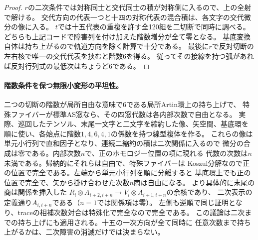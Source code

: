 \begin{proof}
$r$の二次条件では対称同士と交代同士の積が対称側に入るので、上の全射で解ける。
交代方向の代表一つと十四の対称代表の混合積は、各文字の交代微分の像に入る。
$t$では十五代表の重複を許す全120組を二切断で同時に調べる。
どちらも上記コードで障害列を付け加えた階数増分が全て零となる。
基底変換自体は持ち上がるので軌道方向を除く計算で十分である。
最後に$r$で反対切断の左右核で唯一の交代代表を挟むと階数6を得る。
従ってその接線を持つ弧があれば反対行列式の最低次はちょうど6である。
\end{proof}

\paragraph{階数条件を保つ無限小変形の平坦性。}
二つの切断の階数が局所自由な意味で6である局所Artin環上の持ち上げで、
特殊ファイバーが標準AS窓なら、その四窓代数は各内部次数で自由となる。
実際、巡回したテンソル、末尾一文字と二文字を縮約した像、矢空間、基底環を
順に使い、各始点に階数$1,4,6,4,1$の係数を持つ線型複体を作る。
これらの像は単元小行列で直和因子となり、連続二縮約の積は二次関係に入るので
微分の合成は零である。内部次数$n$で、正のホモロジー位置の項に現れる
代数の次数は$n$未満である。帰納的にそれらは自由で、特殊ファイバーは
Koszul分解なので正の位置で完全である。左端から単元小行列を順に分離すると
基底環上でも正の位置で完全で、矢から掛け合わせた次数$n$商は自由になる。
より具体的に末尾の商は関係を挿入した
$R_i\otimes A_{i+2,i+n}\to V_i\otimes A_{i+1,i+n}$の余核であり、
二次表示の定義通り$A_{i,i+n}$である（$n=1$では関係項は零）。
左側も逆順で同じ証明となり、traceの相補次数対合は特殊化で完全なので完全である。
この議論は二次までの持ち上げにも適用される。十五の一次方向が全て同時に
任意次数まで持ち上がるかは、二次障害の消滅だけでは決まらない。
